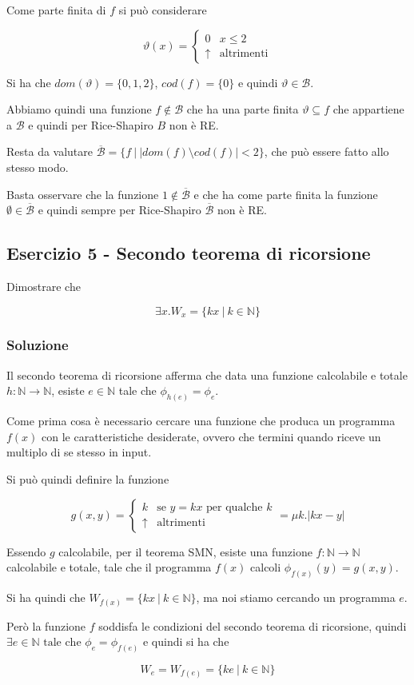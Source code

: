 Come parte finita di $f$ si può considerare

$$
\vartheta(x) = \begin{cases}
0 & x \leq 2 \\
\uparrow &\text{altrimenti}
\end{cases}
$$

Si ha che $dom(\vartheta) = \{0,1,2\}$, $cod(f) = \{0\}$ e quindi $\vartheta \in \mathcal{B}$.

Abbiamo quindi una funzione $f \notin \mathcal{B}$ che ha una parte finita $\vartheta \subseteq f$ che appartiene a $\mathcal{B}$ e quindi per Rice-Shapiro $B$ non è RE.

Resta da valutare $\overline{\mathcal{B}} = \{ f \: | \: |dom(f) \setminus cod(f)| < 2 \}$, che può essere fatto allo stesso modo.

Basta osservare che la funzione $1 \notin \overline{\mathcal{B}}$  e che ha come parte finita la funzione $\emptyset \in \overline{\mathcal{B}}$ e quindi sempre per Rice-Shapiro $\overline{\mathcal{B}}$ non è RE.


\subsection{Esercizio 5 - Secondo teorema di ricorsione}

Dimostrare che 

$$
 \exists x . W_x = \{ kx \: | \: k \in \mathbb{N} \}
$$

\subsubsection{Soluzione}

Il secondo teorema di ricorsione afferma che data una funzione calcolabile e totale $h : \mathbb{N} \rightarrow \mathbb{N}$, esiste $e \in \mathbb{N}$ tale che $\phi_{h(e)} = \phi_e$.

Come prima cosa è necessario cercare una funzione che produca un programma $f(x)$ con le caratteristiche desiderate, ovvero che termini quando riceve un multiplo di se stesso in input.

Si può quindi definire la funzione

$$
g(x,y) = \begin{cases}
k &\text{se } y = kx \text{ per qualche }k \\
 \uparrow &\text{altrimenti}
\end{cases} = \mu k . |kx - y|
$$

Essendo $g$ calcolabile, per il teorema SMN, esiste una funzione $f : \mathbb{N} \rightarrow \mathbb{N}$ calcolabile e totale, tale che il programma $f(x)$ calcoli $\phi_{f(x)}(y) = g(x,y)$.

Si ha quindi che $W_{f(x)} =  \{ kx \: | \: k \in \mathbb{N} \}$, ma noi stiamo cercando un programma $e$.
	
Però la funzione $f$ soddisfa le condizioni del secondo teorema di ricorsione, quindi $\exists e \in \mathbb{N} \text{ tale che } \phi_e = \phi_{f(e)}$ e quindi si ha che

$$
W_e = W_{f(e)} =  \{ ke \: | \: k \in \mathbb{N} \}
$$